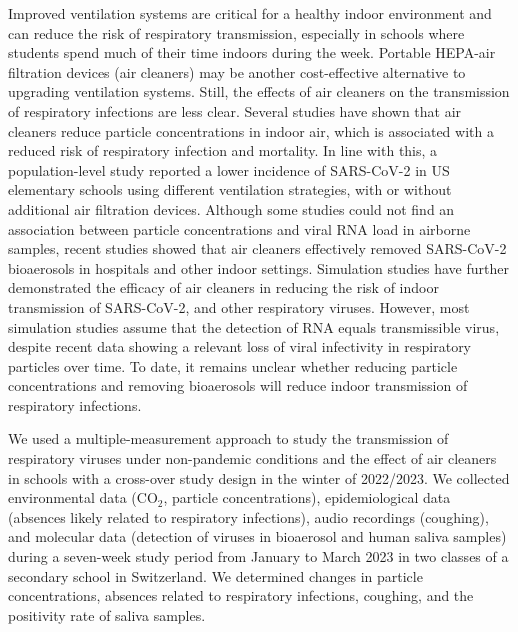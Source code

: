 \documentclass[fleqn,11pt]{wlscirep}
\begin{document}
Improved ventilation systems are critical for a healthy indoor environment and can reduce the risk of respiratory transmission,\cite{Wang2021,Morawska2021} especially in schools where students spend much of their time indoors during the week. Portable HEPA-air filtration devices (air cleaners) may be another cost-effective alternative to upgrading ventilation systems. Still, the effects of air cleaners on the transmission of respiratory infections are less clear. Several studies have shown that air cleaners reduce particle concentrations in indoor air,\cite{Park2020Build,Buising2022InfContr,Banholzer2023PLoSMed} which is associated with a reduced risk of respiratory infection and mortality.\cite{Gordon2014Resp,Kelly2023Atmos,DeAngelis2021EnvRes} In line with this, a population-level study reported a lower incidence of SARS-CoV-2 in US elementary schools using different ventilation strategies, with or without additional air filtration devices.\cite{Gettings2021} Although some studies could not find an association between particle concentrations and viral RNA load in airborne samples,\cite{Nor2021SciRep,Hanna2023PONE} recent studies showed that air cleaners effectively removed SARS-CoV-2 bioaerosols in hospitals and other indoor settings.\cite{Morris2022,Ueki2022mSphere,Myers2022IndoorAir} Simulation studies have further demonstrated the efficacy of air cleaners in reducing the risk of indoor transmission of SARS-CoV-2,\cite{Lindsley2021} and other respiratory viruses.\cite{Cortellessa2023Build} However, most simulation studies assume that the detection of RNA equals transmissible virus, despite recent data showing a relevant loss of viral infectivity in respiratory particles over time.\cite{Oswin2022PNAS} To date, it remains unclear whether reducing particle concentrations and removing bioaerosols will reduce indoor transmission of respiratory infections. 

We used a multiple-measurement approach to study the transmission of respiratory viruses under non-pandemic conditions and the effect of air cleaners in schools with a cross-over study design in the winter of 2022/2023. We collected environmental data (CO$_2$, particle concentrations), epidemiological data (absences likely related to respiratory infections), audio recordings (coughing), and molecular data (detection of viruses in bioaerosol and human saliva samples) during a seven-week study period from January to March 2023 in two classes of a secondary school in Switzerland. We determined changes in particle concentrations, absences related to respiratory infections, coughing, and the positivity rate of saliva samples.
\end{document}
